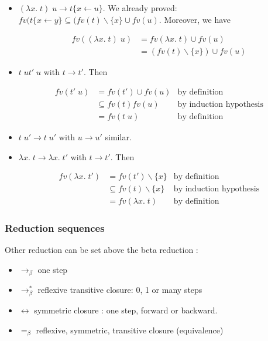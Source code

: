   \begin{itemize}
    \item $(\lambda x.\;t)\;u \to t\{x \leftarrow u\}$. We already proved:
      $fv(t\{x \leftarrow y\} \subseteq (fv(t) \backslash \{x\} \cup fv(u)$.
      Moreover, we have

      \begin{align*}
        fv((\lambda x.\;t)\;u) &= fv(\lambda x.\;t) \cup fv(u) \\
            &= (fv(t)\backslash \{x\}) \cup fv(u)
      \end{align*}
    \item $t\;u t'\; u$ with $t \to t'$. Then

      \begin{align*}
        fv(t'\;u) &= fv(t') \cup fv(u) & \text{by definition} \\
        &\subseteq fv(t) fv(u) & \text{by induction hypothesis} \\
        &= fv(t\; u) & \text{by definition}
      \end{align*}

    \item $t\; u' \to t\; u'$ with $u \to u'$ similar.

    \item $\lambda x.\;t \to \lambda x.\; t'$ with $t\to t'$. Then

      \begin{align*}
        fv(\lambda x.\; t') &= fv(t')\backslash\{x\} & \text{by definition} \\
        &\subseteq fv(t) \backslash \{x\} & \text{by induction hypothesis} \\
        &= fv(\lambda x.\; t) & \text{by definition}
      \end{align*}
  \end{itemize}
  \qedsymbol

  \subsubsection{Reduction sequences}

  Other reduction can be set above the beta reduction :

  \begin{itemize}
    \item $\to_\beta$ one step
    \item $\to_\beta^*$ reflexive transitive closure: 0, 1 or many steps
    \item $\leftrightarrow$ symmetric closure : one step, forward or backward.
    \item $=_\beta$ reflexive, symmetric, transitive closure (equivalence)
  \end{itemize}

